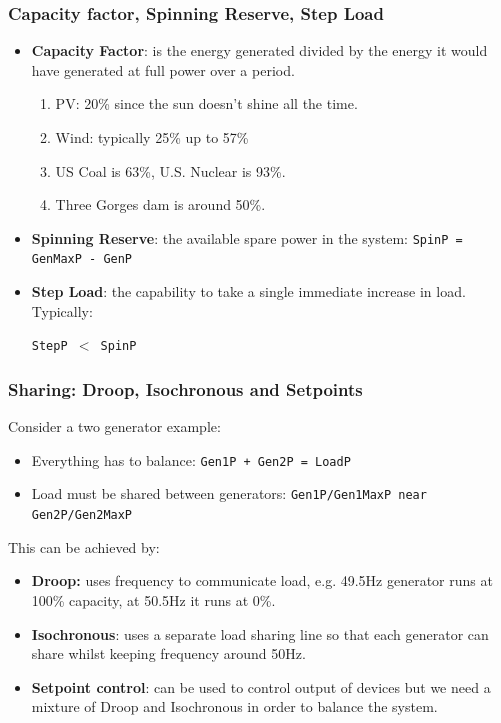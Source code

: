 \documentclass[a4paper,handout]{beamer}
\begin{document}
\begin{frame}\frametitle{Capacity factor, Spinning Reserve, Step Load}
  \begin{itemize}
  \item \textbf{Capacity Factor}: is the energy generated divided by the
    energy it would have generated at full power over a period.
    \pause
    \begin{enumerate}
    \item PV: 20\% since the sun doesn't shine all the time.
    \item Wind: typically 25\% up to 57\% 
    \item US Coal is 63\%, U.S. Nuclear is 93\%.
    \item Three Gorges dam is around 50\%.
    \end{enumerate}
    \pause
  \item \textbf{Spinning Reserve}: the available spare power
    in the system: 
    \texttt{SpinP = GenMaxP - GenP}
    \pause
  \item \textbf{Step Load}: the capability to take a single
    immediate increase in load. Typically: 

    \texttt{StepP $<$ SpinP}
  \end{itemize}
\end{frame}

\begin{frame}\frametitle{Sharing: Droop, Isochronous and Setpoints}
Consider a two generator example:\pause
  \begin{itemize}
  \item Everything has to balance: \texttt{Gen1P + Gen2P = LoadP}\pause
  \item Load must be shared between generators: 
    \texttt{Gen1P/Gen1MaxP near Gen2P/Gen2MaxP}
  \end{itemize}
  This can be achieved by:
  \begin{itemize}
  \item \textbf{Droop:} uses frequency to communicate load, e.g.
    49.5Hz generator runs at 100\% capacity, at 50.5Hz it runs at 0\%.
    \pause
  \item \textbf{Isochronous}: uses a separate load sharing line 
    so that each generator can share whilst keeping frequency around
    50Hz.\pause
  \item \textbf{Setpoint control}: can be used to control output of
    devices but we need a mixture of Droop and Isochronous in order to
    balance the system.
  \end{itemize}
\end{frame}
\end{document}
